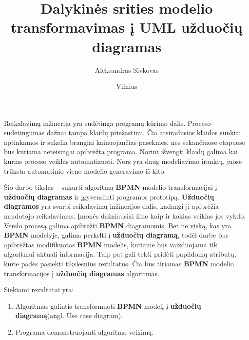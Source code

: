 \documentclass{VUMIFInfBakalaurinis}
\title{Dalykinės srities modelio transformavimas į UML užduočių diagramas}
\author{Aleksandras Sivkovas}
\date{Vilnius \\ \the\year}
\begin{document}
\maketitle

\tableofcontents





Reikalavimų inžinerija yra sudėtinga programų kūrimo dalis. Proceso sudėtingumas dažnai tampa klaidų priežastimi. Čia atsiradusios klaidos sunkiai aptinkamos ir sukelia brangiai kainuojančias pasekmes, nes sekančiuose etapuose bus kuriama neteisingai apibrėžta programa. Norint išvengti klaidų galima kai kurias proceso veiklas automatizuoti. Nors yra daug modeliavimo įrankių, juose trūksta automatinio vieno modelio generavimo iš kito.

Šio darbo tikslas – sukurti algoritmą \textbf{BPMN} modelio transformacijai į \textbf{užduočių diagramas} ir įgyvendinti programos prototipą. \textbf{Užduočių diagramos} yra svarbi reikalavimų inžinerijos dalis, kadangi ji apibrėžia naudotojo reikalavimus. Įmonės dažniausiai žino kaip ir kokias veiklas jos vykdo. Verslo procesą galima apibrėžti \textbf{BPMN} diagramomis. Bet ne viską, kas yra \textbf{BPMN} modelyje, galima perkelti į \textbf{užduočių diagramą}, todėl darbe bus apibrėžtas modifikuotas \textbf{BPMN} modelis, kuriame bus vaizduojama tik algoritmui aktuali informacija. Taip pat gali tekti pridėti papildomų atributų, kurie padės pasiekti tikslesnius rezultatus. Čia bus tiriamas \textbf{BPMN} modelio transformacijos į \textbf{užduočių diagramas} algoritmas.

Siekiami rezultatai yra:
\begin{enumerate}
	\item Algoritmas galintis transformuoti \textbf{BPMN} modelį į \textbf{užduočių diagramą}(angl. Use case diagram).
	\item Programa demonstruojanti algoritmo veikimą.
\end{enumerate}


\end{document}
